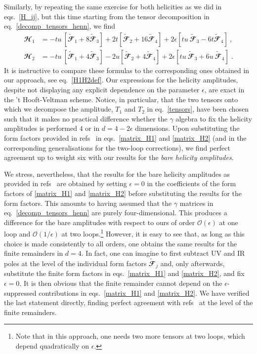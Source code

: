 Similarly, by repeating the same exercise for both helicities as we did 
in eqs.~\eqref{H_ij},  
but this time starting from the tensor decomposition in eq.~\eqref{decomp_tensors_henn},
we find
\begin{align}
\mathbfcal{H}_1 &=  -tu\: \left[ \widetilde{\mathbfcal{F}}_1 + 8 \widetilde{\mathbfcal{F}}_3 \right]
+2 t\left[ \widetilde{\mathbfcal{F}}_2 + 16 \widetilde{\mathbfcal{F}}_4 \right]  
+ 2 \epsilon \left[ t u\: \widetilde{\mathbfcal{F}}_3 - 6t \widetilde{\mathbfcal{F}}_4 \right] \: ,  \label{matrix_H1}\\
\mathbfcal{H}_2 &=  -tu \: \left[ \widetilde{\mathbfcal{F}}_1 + 4 \widetilde{\mathbfcal{F}}_3\right] 
- 2 u\left[ \widetilde{\mathbfcal{F}}_2 + 4 \widetilde{\mathbfcal{F}}_4 \right] 
+ 2\epsilon \left[ t u \:\widetilde{\mathbfcal{F}}_3 + 6 u\:\widetilde{\mathbfcal{F}}_4 \right] \; .\label{matrix_H2}
\end{align}
It is instructive to compare these formulas to the corresponding ones 
obtained in our approach, see eq.~\eqref{H1H2def}.
Our expressions for the helicity amplitudes, despite not displaying 
any explicit dependence on the parameter
$\epsilon$,  are exact in the 't Hooft-Veltman scheme. 
Notice, in particular, that the two tensors onto which we decompose the
amplitude,
${T}_1$ and ${T}_2$ in eq.~\eqref{tensors}, 
have been chosen such that it makes no practical difference
whether the $\gamma$ algebra to fix the helicity amplitudes
is performed $4$ or in $d=4 - 2 \epsilon$ dimensions. 
Upon substituting the form factors provided in refs~\cite{Glover:2004si,Ahmed:2019qtg} in eqs.~\eqref{matrix_H1} and \eqref{matrix_H2} (and in the corresponding
generalisations for the two-loop corrections),
we find perfect agreement up to weight six with 
our results for the \emph{bare helicity amplitudes}.

We stress, nevertheless, that the results for the bare helicity amplitudes as provided in refs~\cite{Glover:2004si,Ahmed:2019qtg} are obtained 
by setting $\epsilon=0$ in the coefficients of the form factors 
of \eqref{matrix_H1} and \eqref{matrix_H2} before substituting
the results for the form factors. This amounts to having assumed that the $\gamma$ matrices in eq.~\eqref{decomp_tensors_henn} are purely four-dimensional.  
This produces a difference for the bare amplitudes with respect to ours 
of order $\mathcal{O}(\epsilon)$ 
at one loop and $\mathcal{O}(1/\epsilon)$ at 
two loops.\footnote{Note that in this approach, one needs two more tensors 
at two loops, which depend quadratically on $\epsilon$.}  
However, it is easy to see that, as long as this choice is made 
consistently to all orders,  one obtains the same results for the 
finite remainders in $d=4$. 
In fact, one can imagine to first subtract UV and IR poles at the level of 
the individual form factors $\widetilde{\mathbfcal{F}}_j$ and, only afterwards,
substitute the finite form factors in eqs.~\eqref{matrix_H1} and \eqref{matrix_H2}, and fix $\epsilon = 0$. 
It is then obvious that the finite remainder cannot depend on 
the $\epsilon$-suppressed contributions in eqs.~\eqref{matrix_H1} 
and \eqref{matrix_H2}.
 We have verified the last statement directly, finding perfect agreement with refs~\cite{Glover:2004si,Ahmed:2019qtg} at the level
 of the finite remainders. 


